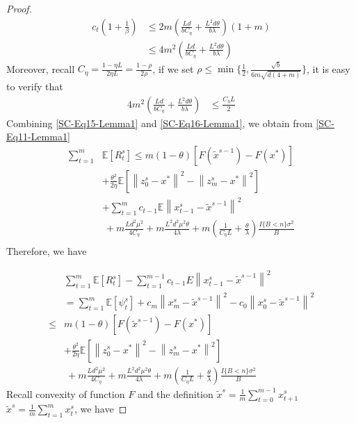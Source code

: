\documentclass{article}
\newcommand*{\E}{\mathbb{E}}
\newcommand{\norm}[1]{\left\lVert#1\right\rVert}
\theoremstyle{definition}
\theoremstyle{remark}
\begin{document}
{{\begin{proof}
\begin{equation}\label{SC-Eq15-Lemma1}
\begin{split}
c_{t}(1+\frac{1}{\beta})&\leq 2m(\frac{Ld}{bC_{\eta} }+\frac{L^2d\theta}{b\lambda })(1+m)\\
&\leq 4m^2(\frac{Ld}{bC_{\eta} }+\frac{L^2d\theta}{b\lambda })
\end{split}
\end{equation}\label{SC-Eq16-Lemma1}
Moreover, recall $C_{\eta} = \frac{1-\eta L}{2\eta L} = \frac{1-\rho}{2\rho}$, if we set $\rho\leq \min\{\frac{1}{2},\frac{\sqrt{b}}{6m\sqrt{d(4+m)}}\}$, it is easy to verify that
 \begin{align}
 4m^2(\frac{Ld}{bC_{\eta} }+\frac{L^2d\theta}{b\lambda }) &\leq \frac{C_{\eta} L}{2}\label{SC-Eq16-Lemma1}
\end{align} 
Combining \eqref{SC-Eq15-Lemma1} and \eqref{SC-Eq16-Lemma1},  we obtain from \eqref{SC-Eq11-Lemma1}
\begin{equation}
\begin{split}
\sum_{t=1}^{m} &\E[R_{t}^s]\leq m(1-\theta)[F(\widetilde{x}^{s-1})-F(x^*)] \\
&+ {\frac{ \theta^2}{2\eta}}\E[\norm{z_{0}^s-x^*}^2-\norm{z_{m}^s-x^*}^2]\\
&+ \sum_{t=1}^{m} c_{t-1}\E\norm{x_{t-1}^s-\widetilde{x}^{s-1}}^2\\
&~+m\frac{Ld^2\mu^2}{4C_{\eta}}+m\frac{ L^2d^2\mu^2\theta}{4\lambda}+m(\frac{1}{C_{\eta} L}+\frac{\theta}{\lambda})\frac{I\{B < n\} \sigma ^2}{B}\\
\end{split}
\end{equation}
Therefore, we have

\begin{equation}\label{SC-Eq17-Lemma1}
\begin{split}
&\sum_{t=1}^{m} \E[R_{t}^s]-\sum_{t=1}^{m-1}c_{t-1} E\norm{x_{t-1}^s-\widetilde{x}^{s-1}}^2\\
&= \sum_{t=1}^{m}\E[\psi_{t}^s] + c_{m}\norm{x_{m}^s-\widetilde{x}^{s-1}}^2-c_{0}\norm{x_{0}^s-\widetilde{x}^{s-1}}^2\\
\leq &m(1-\theta)[F(\widetilde{x}^{s-1})-F(x^*)] \\
&+ {\frac{ \theta^2}{2\eta}}\E[\norm{z_{0}^s-x^*}^2-\norm{z_{m}^s-x^*}^2]\\
&~+m\frac{Ld^2\mu^2}{4C_{\eta}}+m\frac{ L^2d^2\mu^2\theta}{4\lambda}+m(\frac{1}{C_{\eta} L}+\frac{\theta}{\lambda})\frac{I\{B < n\} \sigma ^2}{B}
\end{split}
\end{equation}
Recall convexity of function $F$ and the definition $\widetilde{x}^s = \frac{1}{m}\sum_{t=0}^{m-1}x_{t+1}^s$ $\widetilde{x}^s = \frac{1}{m}\sum_{t=1}^{m}x_{t}^s$, we have 


\end{proof}}}
\end{document}
